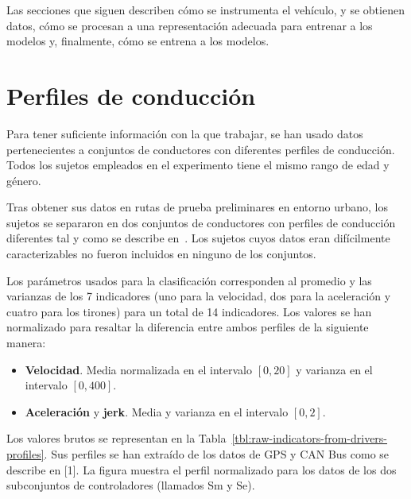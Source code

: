 {Las secciones que siguen describen cómo se instrumenta el vehículo, y se obtienen datos, cómo se procesan a una representación adecuada para entrenar a los modelos y, finalmente, cómo se entrena a los modelos.


\section{Perfiles de conducción}

Para tener suficiente información con la que trabajar, se han usado datos pertenecientes a conjuntos de conductores con diferentes perfiles de conducción. Todos los sujetos empleados en el experimento tiene el mismo rango de edad y género.

Tras obtener sus datos en rutas de prueba preliminares en entorno urbano, los sujetos se separaron en dos conjuntos de conductores con perfiles de conducción diferentes tal y como se describe en~\cite{DiazAlvarez2014}. Los sujetos cuyos datos eran difícilmente caracterizables no fueron incluidos en ninguno de los conjuntos.

Los parámetros usados para la clasificación corresponden al promedio y las varianzas de los 7 indicadores (uno para la velocidad, dos para la aceleración y cuatro para los tirones) para un total de 14 indicadores. Los valores se han normalizado para resaltar la diferencia entre ambos perfiles de la siguiente manera:

\begin{itemize}
	\item \textbf{Velocidad}. Media normalizada en el intervalo $[0, 20]$ y varianza en el intervalo $[0, 400]$.
	\item \textbf{Aceleración} y \textbf{jerk}. Media y varianza en el intervalo $[0, 2]$.
\end{itemize}

Los valores brutos se representan en la Tabla~\ref{tbl:raw-indicators-from-drivers-profiles}. Sus perfiles se han extraído de los datos de GPS y CAN Bus como se describe en [1]. La figura muestra el perfil normalizado para los datos de los dos subconjuntos de controladores (llamados Sm y Se).

}
